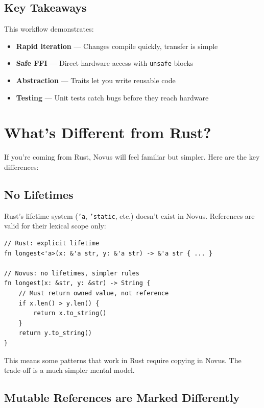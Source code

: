\subsection{Key Takeaways}

This workflow demonstrates:

\begin{itemize}
    \item \textbf{Rapid iteration} --- Changes compile quickly, transfer is simple
    \item \textbf{Safe FFI} --- Direct hardware access with \texttt{unsafe} blocks
    \item \textbf{Abstraction} --- Traits let you write reusable code
    \item \textbf{Testing} --- Unit tests catch bugs before they reach hardware
\end{itemize}

\section{What's Different from Rust?}
\label{sec:rust-differences}

If you're coming from Rust, Novus will feel familiar but simpler. Here are the key differences:

\subsection{No Lifetimes}

Rust's lifetime system (\texttt{'a}, \texttt{'static}, etc.) doesn't exist in Novus. References are valid for their lexical scope only:

\begin{lstlisting}
// Rust: explicit lifetime
fn longest<'a>(x: &'a str, y: &'a str) -> &'a str { ... }

// Novus: no lifetimes, simpler rules
fn longest(x: &str, y: &str) -> String {
    // Must return owned value, not reference
    if x.len() > y.len() {
        return x.to_string()
    }
    return y.to_string()
}
\end{lstlisting}

This means some patterns that work in Rust require copying in Novus. The trade-off is a much simpler mental model.

\subsection{Mutable References are Marked Differently}

